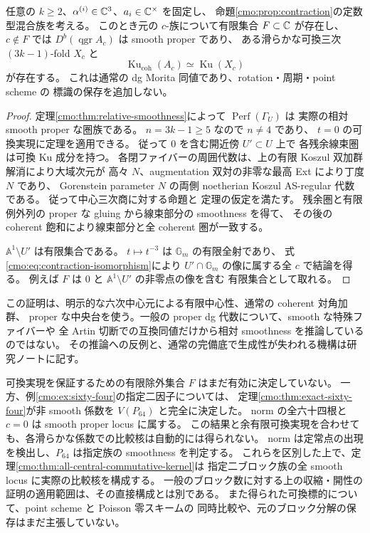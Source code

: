 \begin{corollary}[定数型混合族の余有限可換実現]
\label{cmo:cor:cofinite}
任意の $k\ge2$、$\alpha^{(i)}\in\mathbb C^3$、$a_i\in\mathbb C^\times$ を固定し、
命題\ref{cmo:prop:contraction}の定数型混合族を考える。
このとき元の $c$-族について有限集合 $F\subset\mathbb C$ が存在し、
$c\notin F$ では $D^b(\operatorname{qgr}A_c)$ は smooth proper であり、
ある滑らかな可換三次 $(3k-1)$-fold $X_c$ と
\[
 \operatorname{Ku}_{\mathrm{coh}}(A_c)
             \simeq\operatorname{Ku}(X_c)
\]
が存在する。
これは通常の dg Morita 同値であり、rotation・周期・point scheme の
標識の保存を追加しない。
\end{corollary}

\begin{proof}
定理\ref{cmo:thm:relative-smoothness}によって $\operatorname{Perf}(\Gamma_U)$ は
実際の相対 smooth proper な圏族である。
$n=3k-1\geq5$ なので $n\ne4$ であり、
$t=0$ の可換実現に定理を適用できる。
従って $0$ を含む開近傍 $U'\subset U$ 上で
各残余線束圏は可換 Ku 成分を持つ。
各閉ファイバーの周囲代数は、上の有限 Koszul 双加群解消により大域次元が
高々 $N$、augmentation 双対の非零な最高 Ext により丁度 $N$ であり、
Gorenstein parameter $N$ の両側 noetherian Koszul AS-regular 代数である。
従って中心三次商に対する命題と
定理の仮定を満たす。
残余圏と有限例外列の proper な gluing から線束部分の smoothness を得て、
その後の coherent 飽和により線束部分と全 coherent 圏が一致する。

$\mathbb A^1\setminus U'$ は有限集合である。
$t\mapsto t^{-3}$ は $\mathbb G_m$ の有限全射であり、
式\eqref{cmo:eq:contraction-isomorphism}により
$U'\cap\mathbb G_m$ の像に属する全 $c$ で結論を得る。
例えば $F$ は $0$ と $\mathbb A^1\setminus U'$ の非零点の像を含む
有限集合として取れる。
\end{proof}

\begin{remark}[有限中心性の役割と残る個別判定]
\label{cmo:rem:cofinite-scope}
この証明は、明示的な六次中心元による有限中心性、通常の coherent 対角加群、
proper な中央台を使う。一般の proper dg 代数について、smooth な特殊ファイバーや
全 Artin 切断での互換同値だけから相対 smoothness を推論しているのではない。
その推論への反例と、通常の完備底で生成性が失われる機構は研究ノートに記す。

可換実現を保証するための有限除外集合 $F$ はまだ有効に決定していない。
一方、例\ref{cmo:ex:sixty-four}の指定二因子については、
定理\ref{cmo:thm:exact-sixty-four}が非 smooth 係数を $V(P_{64})$ と完全に決定した。
norm の全六十四根と $c=0$ は smooth proper locus に属する。
この結果と余有限可換実現を合わせても、各滑らかな係数での比較核は自動的には得られない。
norm は定常点の出現を検出し、$P_{64}$ は指定族の smoothness を判定する。
これらを区別した上で、定理\ref{cmo:thm:all-central-commutative-kernel}は
指定二ブロック族の全 smooth locus に実際の比較核を構成する。
一般のブロック数に対する上の収縮・開性の証明の適用範囲は、その直接構成とは別である。
また得られた可換標的について、point scheme と Poisson 零スキームの
同時比較や、元のブロック分解の保存はまだ主張していない。
\end{remark}

